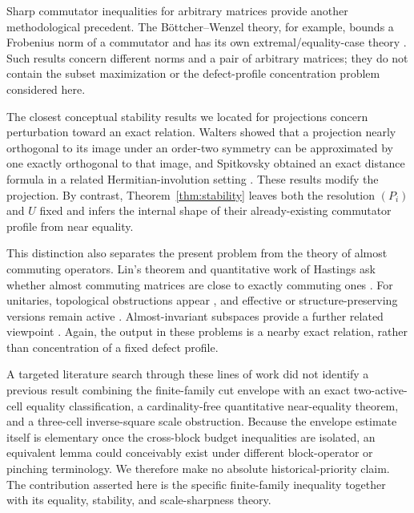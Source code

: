 \documentclass[11pt]{article}
\begin{document}
Sharp commutator inequalities for arbitrary matrices provide another
methodological precedent.  The B{\"o}ttcher--Wenzel theory, for example,
bounds a Frobenius norm of a commutator and has its own extremal/equality-case
theory \cite{BottcherWenzel2008}.  Such results concern different norms and a
pair of arbitrary matrices; they do not contain the subset maximization or
the defect-profile concentration problem considered here.

The closest conceptual stability results we located for projections concern
perturbation toward an exact relation.  Walters showed that a projection
nearly orthogonal to its image under an order-two symmetry can be approximated
by one exactly orthogonal to that image, and Spitkovsky obtained an exact
distance formula in a related Hermitian-involution setting
\cite{Walters2017,Spitkovsky2018Distance}.  These results modify the
projection.  By contrast, Theorem~\ref{thm:stability} leaves both the
resolution $(P_i)$ and $U$ fixed and infers the internal shape of their
already-existing commutator profile from near equality.

This distinction also separates the present problem from the theory of
almost commuting operators.  Lin's theorem and quantitative work of Hastings
ask whether almost commuting matrices are close to exactly commuting ones
\cite{Lin1997AlmostCommuting,FriisRordam1996,Hastings2009}.  For unitaries,
topological obstructions appear
\cite{Voiculescu1983,ExelLoring1989,ExelLoring1991}, and effective or
structure-preserving versions remain active
\cite{DorOnHallKachkovskiy2025,Herrera2024,Herrera2026}.  Almost-invariant
subspaces provide a further related viewpoint
\cite{MarcouxPopovRadjavi2013}.  Again, the output in these problems is a
nearby exact relation, rather than concentration of a fixed defect profile.

A targeted literature search through these lines of work did not identify a
previous result combining the finite-family cut envelope with an exact
two-active-cell equality classification, a cardinality-free quantitative
near-equality theorem, and a three-cell inverse-square scale obstruction.
Because the envelope estimate itself is elementary once the cross-block
budget inequalities are isolated, an equivalent lemma could conceivably
exist under different block-operator or pinching terminology.  We therefore
make no absolute historical-priority claim.  The contribution asserted here
is the specific finite-family inequality together with its equality,
stability, and scale-sharpness theory.
\end{document}
